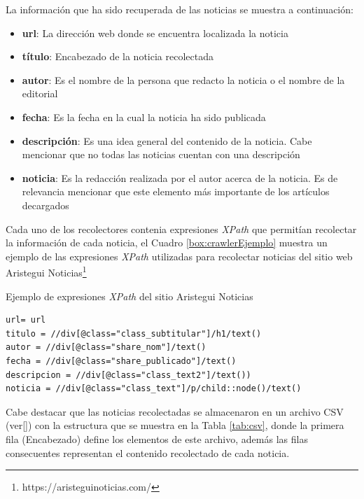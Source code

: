 La información que ha sido recuperada de las noticias se muestra a continuación:
\begin{itemize}
	\item \textbf{url}: La dirección web donde se encuentra localizada la noticia 
	\item \textbf{título}: Encabezado de la noticia recolectada
	\item \textbf{autor}: Es el nombre de la persona que redacto la noticia o el nombre de la editorial
	\item \textbf{fecha}: Es la fecha en la cual la noticia ha sido publicada
	\item \textbf{descripción}: Es una idea general del contenido de la noticia. Cabe mencionar que no todas las noticias cuentan con una descripción
	\item \textbf{noticia}: Es la redacción realizada por el autor acerca de la noticia. Es de relevancia mencionar que este elemento más importante de los artículos decargados 
\end{itemize}

Cada uno de los recolectores contenia expresiones \textit{XPath} que permitían recolectar la información de cada noticia, el Cuadro \ref{box:crawlerEjemplo} muestra un ejemplo de las expresiones \textit{XPath} utilizadas para recolectar noticias del sitio web Aristegui Noticias\footnote{https://aristeguinoticias.com/}\\

\begin{mygraybox}[label={box:crawlerEjemplo}]{Ejemplo de expresiones \textit{XPath} del sitio Aristegui Noticias}
\begin{small}
\begin{verbatim}
url= url
titulo = //div[@class="class_subtitular"]/h1/text()
autor = //div[@class="share_nom"]/text()
fecha = //div[@class="share_publicado"]/text()
descripcion = //div[@class="class_text2"]/text())
noticia = //div[@class="class_text"]/p/child::node()/text()
\end{verbatim}
\end{small}
\end{mygraybox}

Cabe destacar que las noticias recolectadas se almacenaron en un archivo CSV (ver\ref{}) con la estructura que se muestra en la Tabla \ref{tab:csv}, donde la primera fila (Encabezado) define los elementos de este archivo, además las filas consecuentes representan el contenido recolectado de cada noticia.\\

